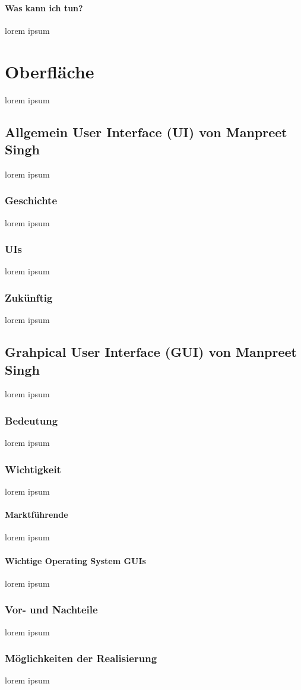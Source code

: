 \documentclass[10pt,a4paper]{report}
\begin{document}
\paragraph{Was kann ich tun?}
lorem ipsum
\section{Oberfläche}
lorem ipsum
\subsection{Allgemein User Interface (UI) von Manpreet Singh}
lorem ipsum
\subsubsection{Geschichte}
lorem ipsum
\subsubsection{UIs}
lorem ipsum 
\subsubsection{Zukünftig}
lorem ipsum 
\subsection{Grahpical User Interface (GUI) von Manpreet Singh}
lorem ipsum
\subsubsection{Bedeutung}
lorem ipsum
\subsubsection{Wichtigkeit}
lorem ipsum
\paragraph{Marktführende}
lorem ipsum
\paragraph{Wichtige Operating System GUIs}
lorem ipsum
\subsubsection{Vor- und Nachteile}
lorem ipsum
\subsubsection{Möglichkeiten der Realisierung}
lorem ipsum
\end{document}
